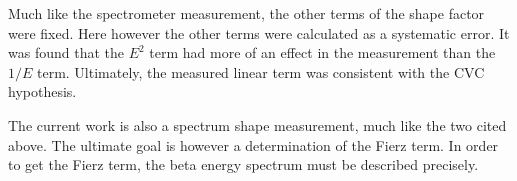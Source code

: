 \documentclass[../MaxHughesThesis.tex]{subfiles}
\begin{document}
Much like the spectrometer measurement, the other terms of the shape factor were fixed.
Here however the other terms were calculated as a systematic error.
It was found that the $E^{2}$ term had more of an effect in the measurement than the $1/E$ term.
Ultimately, the measured linear term was consistent with the CVC hypothesis. 

The current work is also a spectrum shape measurement, much like the two cited above.
The ultimate goal is however a  determination of the Fierz term. 
In order to get the Fierz term, the beta energy spectrum must be described precisely.
\end{document}
